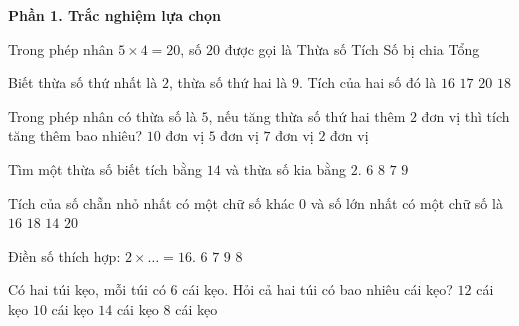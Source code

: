 \textbf{Phần 1. Trắc nghiệm lựa chọn}

\begin{ex} %
Trong phép nhân $5 \times 4 = 20$, số $20$ được gọi là
\choice
{Thừa số}
{\True Tích}
{Số bị chia}
{Tổng}
\end{ex}

\begin{ex} %
Biết thừa số thứ nhất là $2$, thừa số thứ hai là $9$. Tích của hai số đó là
\choice
{$16$}
{$17$}
{$20$}
{\True $18$}
\end{ex}

\begin{ex} %
Trong phép nhân có thừa số là $5$, nếu tăng thừa số thứ hai thêm $2$ đơn vị thì tích tăng thêm bao nhiêu?
\choice
{\True $10$ đơn vị}
{$5$ đơn vị}
{$7$ đơn vị}
{$2$ đơn vị}
\end{ex}

\begin{ex} %
Tìm một thừa số biết tích bằng $14$ và thừa số kia bằng $2$.
\choice
{$6$}
{$8$}
{\True $7$}
{$9$}
\end{ex}

\begin{ex} %
Tích của số chẵn nhỏ nhất có một chữ số khác 0 và số lớn nhất có một chữ số là
\choice
{$16$}
{\True $18$}
{$14$}
{$20$}
\end{ex}

\begin{ex} %
Điền số thích hợp: $2 \times \dots = 16$.
\choice
{$6$}
{$7$}
{$9$}
{\True $8$}
\end{ex}

\begin{ex} %
Có hai túi kẹo, mỗi túi có $6$ cái kẹo. Hỏi cả hai túi có bao nhiêu cái kẹo?
\choice
{\True $12$ cái kẹo}
{$10$ cái kẹo}
{$14$ cái kẹo}
{$8$ cái kẹo}
\end{ex}

